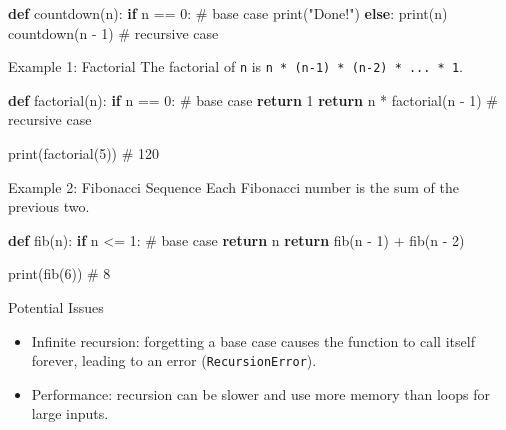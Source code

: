 \documentclass[
  letterpaper,
  DIV=11,
  numbers=noendperiod]{scrreprt}
\newenvironment{Shaded}{\begin{snugshade}}{\end{snugshade}}
\newcommand{\BuiltInTok}[1]{\textcolor[rgb]{0.00,0.23,0.31}{#1}}
\newcommand{\CommentTok}[1]{\textcolor[rgb]{0.37,0.37,0.37}{#1}}
\newcommand{\ControlFlowTok}[1]{\textcolor[rgb]{0.00,0.23,0.31}{\textbf{#1}}}
\newcommand{\DecValTok}[1]{\textcolor[rgb]{0.68,0.00,0.00}{#1}}
\newcommand{\KeywordTok}[1]{\textcolor[rgb]{0.00,0.23,0.31}{\textbf{#1}}}
\newcommand{\NormalTok}[1]{\textcolor[rgb]{0.00,0.23,0.31}{#1}}
\newcommand{\OperatorTok}[1]{\textcolor[rgb]{0.37,0.37,0.37}{#1}}
\newcommand{\StringTok}[1]{\textcolor[rgb]{0.13,0.47,0.30}{#1}}
\providecommand{\tightlist}{%
  \setlength{\itemsep}{0pt}\setlength{\parskip}{0pt}}
\begin{document}
\begin{Shaded}
\begin{Highlighting}[]
\KeywordTok{def}\NormalTok{ countdown(n):}
    \ControlFlowTok{if}\NormalTok{ n }\OperatorTok{==} \DecValTok{0}\NormalTok{:             }\CommentTok{\# base case}
        \BuiltInTok{print}\NormalTok{(}\StringTok{"Done!"}\NormalTok{)}
    \ControlFlowTok{else}\NormalTok{:}
        \BuiltInTok{print}\NormalTok{(n)}
\NormalTok{        countdown(n }\OperatorTok{{-}} \DecValTok{1}\NormalTok{)   }\CommentTok{\# recursive case}
\end{Highlighting}
\end{Shaded}

Example 1: Factorial The factorial of \texttt{n} is
\texttt{n\ *\ (n-1)\ *\ (n-2)\ *\ ...\ *\ 1}.

\begin{Shaded}
\begin{Highlighting}[]
\KeywordTok{def}\NormalTok{ factorial(n):}
    \ControlFlowTok{if}\NormalTok{ n }\OperatorTok{==} \DecValTok{0}\NormalTok{:     }\CommentTok{\# base case}
        \ControlFlowTok{return} \DecValTok{1}
    \ControlFlowTok{return}\NormalTok{ n }\OperatorTok{*}\NormalTok{ factorial(n }\OperatorTok{{-}} \DecValTok{1}\NormalTok{)   }\CommentTok{\# recursive case}

\BuiltInTok{print}\NormalTok{(factorial(}\DecValTok{5}\NormalTok{))   }\CommentTok{\# 120}
\end{Highlighting}
\end{Shaded}

Example 2: Fibonacci Sequence Each Fibonacci number is the sum of the
previous two.

\begin{Shaded}
\begin{Highlighting}[]
\KeywordTok{def}\NormalTok{ fib(n):}
    \ControlFlowTok{if}\NormalTok{ n }\OperatorTok{\textless{}=} \DecValTok{1}\NormalTok{:   }\CommentTok{\# base case}
        \ControlFlowTok{return}\NormalTok{ n}
    \ControlFlowTok{return}\NormalTok{ fib(n }\OperatorTok{{-}} \DecValTok{1}\NormalTok{) }\OperatorTok{+}\NormalTok{ fib(n }\OperatorTok{{-}} \DecValTok{2}\NormalTok{)}

\BuiltInTok{print}\NormalTok{(fib(}\DecValTok{6}\NormalTok{))   }\CommentTok{\# 8}
\end{Highlighting}
\end{Shaded}

Potential Issues

\begin{itemize}
\tightlist
\item
  Infinite recursion: forgetting a base case causes the function to call
  itself forever, leading to an error (\texttt{RecursionError}).
\item
  Performance: recursion can be slower and use more memory than loops
  for large inputs.
\end{itemize}
\end{document}
